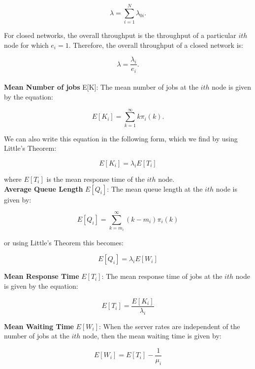 \documentclass[a4paper,11pt,titlepage]{article}
\begin{document}
\begin{equation}
    \lambda = \sum_{i=1}^{N} \lambda_{0i}.
\end{equation}

For closed networks, the overall throughput is the throughput of a particular $ith$ node for which $e_i = 1$. Therefore, the overall throughput of a closed network is:

\begin{equation}
    \lambda = \frac{\lambda_i}{e_i}.
\end{equation} \\

\textbf{Mean Number of jobs} E[K]: The mean number of jobs at the $ith$ node is given by the equation: 

\begin{equation}
    E[K_i] = \sum_{k=1}^{\infty} k \pi_i(k).
\end{equation}

We can also write this equation in the following form, which we find by using Little's Theorem: 

\begin{equation}
    E[K_i] = \lambda_i E[T_i]
\end{equation}

where $E[T_i]$ is the mean response time of the $ith$ node. \\

\textbf{Average Queue Length} $E[Q_i]$: The mean queue length at the $ith$ node is given by:

\begin{equation}
    E[Q_i] = \sum_{k=m_i}^{\infty} (k-m_i)\pi_i(k)
\end{equation}

or using Little's Theorem this becomes: 

\begin{equation}
    E[Q_i] = \lambda_i E[W_i]
\end{equation}

\textbf{Mean Response Time} $E[T_i]$: The mean response time of jobs at the $ith$ node is given by the equation: 

\begin{equation}
    E[T_i] = \frac{E[K_i]}{\lambda_i}
\end{equation}

\textbf{Mean Waiting Time} $E[W_i]$: When the server rates are independent of the number of jobs at the $ith$ node, then the mean waiting time is given by:

\begin{equation}
    E[W_i] = E[T_i] - \frac{1}{\mu_i}
\end{equation}
\end{document}
